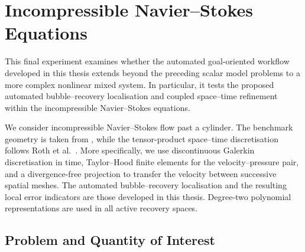 \section{Incompressible Navier–Stokes Equations}
\label{sec:cylinder-nonlinear-dwr}

This final experiment examines whether the automated goal-oriented workflow developed in this thesis extends beyond the preceding scalar model problems to a more complex nonlinear mixed system. In particular, it tests the proposed automated bubble--recovery localisation and coupled space--time refinement within the incompressible Navier--Stokes equations. 

We consider incompressible Navier--Stokes flow past a cylinder. The benchmark geometry is taken from \cite{benchmark,reference_value}, while the tensor-product space--time discretisation follows Roth et al.~\cite{non-flow}. More specifically, we use discontinuous Galerkin discretisation in time, Taylor--Hood finite elements \cite{TaylorHood} for the velocity--pressure pair, and a divergence-free projection \cite{projection} to transfer the velocity between successive spatial meshes. The automated bubble--recovery localisation and the resulting local error indicators are those developed in this thesis. Degree-two polynomial representations are used in all active recovery spaces.

\subsection{Problem and Quantity of Interest}
\label{subsec:cylinder-problem}

